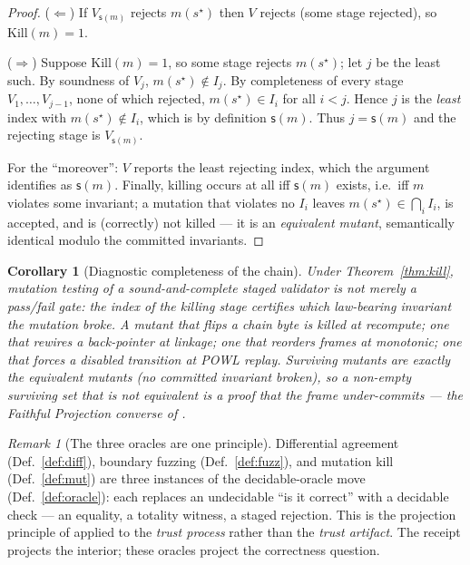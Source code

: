 \documentclass[11pt,oneside]{book}
\theoremstyle{definition}
\theoremstyle{plain}
\newtheorem{corollary}[theorem]{Corollary}
\theoremstyle{remark}
\newtheorem*{remark}{Remark}
\newcommand{\Kill}{\mathrm{Kill}}
\newcommand{\stg}{\mathsf{s}}                  %
\begin{document}
\begin{proof}
($\Leftarrow$) If $V_{\stg(m)}$ rejects $m(s^\star)$ then $V$ rejects (some stage rejected), so
$\Kill(m)=1$.

($\Rightarrow$) Suppose $\Kill(m)=1$, so some stage rejects $m(s^\star)$; let $j$ be the least
such. By soundness of $V_j$, $m(s^\star)\notin I_j$. By completeness of every stage
$V_1,\dots,V_{j-1}$, none of which rejected, $m(s^\star)\in I_i$ for all $i<j$. Hence $j$ is the
\emph{least} index with $m(s^\star)\notin I_i$, which is by definition $\stg(m)$. Thus $j=\stg(m)$
and the rejecting stage is $V_{\stg(m)}$.

For the ``moreover'': $V$ reports the least rejecting index, which the argument identifies as
$\stg(m)$. Finally, killing occurs at all iff $\stg(m)$ exists, i.e.\ iff $m$ violates some
invariant; a mutation that violates no $I_i$ leaves $m(s^\star)\in\bigcap_i I_i$, is accepted, and
is (correctly) not killed --- it is an \emph{equivalent mutant}, semantically identical modulo the
committed invariants.
\end{proof}

\begin{corollary}[Diagnostic completeness of the chain]\label{cor:diag}
Under Theorem~\ref{thm:kill}, mutation testing of a sound-and-complete staged validator is not
merely a pass/fail gate: the \emph{index} of the killing stage certifies \emph{which} law-bearing
invariant the mutation broke. A mutant that flips a chain byte is killed at \emph{recompute}; one
that rewires a back-pointer at \emph{linkage}; one that reorders frames at \emph{monotonic}; one
that forces a disabled transition at \emph{POWL replay}. Surviving mutants are exactly the
equivalent mutants (no committed invariant broken), so a non-empty surviving set that is
\emph{not} equivalent is a proof that the frame under-commits --- the Faithful Projection
converse of \cite[Thm.~3.2]{keystone}.
\end{corollary}

\begin{remark}[The three oracles are one principle]
Differential agreement (Def.~\ref{def:diff}), boundary fuzzing (Def.~\ref{def:fuzz}), and mutation
kill (Def.~\ref{def:mut}) are three instances of the decidable-oracle move
(Def.~\ref{def:oracle}): each replaces an undecidable ``is it correct'' with a decidable check ---
an equality, a totality witness, a staged rejection. This is the projection principle of
\cite{keystone} applied to the \emph{trust process} rather than the \emph{trust artifact}. The
receipt projects the interior; these oracles project the correctness question.
\end{remark}
\end{document}
